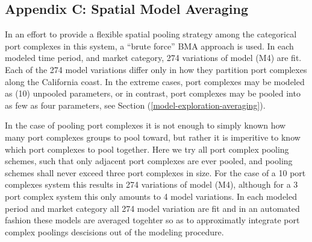 \documentclass[12pt]{article}
\begin{document}
%
%
%

\subsection{Appendix C: Spatial Model Averaging}\label{appBMA}


In an effort to provide a flexible spatial pooling strategy among the 
categorical port complexes in this system, a ``brute force'' BMA approach 
is used. In each modeled time period, and market category, 274 variations of 
model (M4) are fit. Each of the 274 model variations differ only in how they 
partition port complexes along the California coast. In the extreme cases, 
port complexes may be modeled as (10) unpooled parameters, or in contrast, port 
complexes may be pooled into as few as four parameters, see Section (\ref{model-exploration-averaging}). 

In the case of pooling port complexes it is not enough to simply known how 
many port complexes groups to pool toward, but rather it is imperitive to 
know which port complexes to pool together. Here we try all port complex 
pooling schemes, such that only adjacent port complexes are ever pooled, and
pooling schemes shall never exceed three port complexes in size. For the case 
of a 10 port complexes system this results in 274 variations of model (M4), 
although for a 3 port complex system this only amounts to 4 model variations. 
In each modeled period and market category all 274 model variation 
are fit and in an automated fashion these models are averaged togehter so as 
to approximatly integrate port complex poolings descisions out of the modeling 
procedure.  
\end{document}
